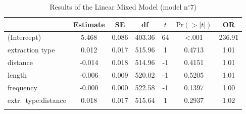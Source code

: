 \begin{table}
\begin{tabularx}{\textwidth}{Q S[table-format=-1.3] 
                  S[table-format=1.3] 
                  S[table-format=3.2] 
                  S[table-format=-1] 
                  S[table-format=<1.4] 
                  S[table-format=3.2]}
  \lsptoprule
 & {Estimate} & {SE} & {df} & {$t$} & {$\text{Pr}(>|t|)$} & {OR} \\ 
  \midrule
(Intercept) & 5.468 & 0.086 & 403.36 & 64 & <.001 & 236.91 \\ 
  extraction type & 0.012 & 0.017 & 515.96 & 1 & 0.4713 & 1.01 \\ 
  distance & -0.014 & 0.018 & 514.96 & -1 & 0.4151 & 1.01 \\ 
  length & -0.006 & 0.009 & 520.02 & -1 & 0.5205 & 1.01 \\ 
  frequency & -0.000 & 0.000 & 522.58 & -1 & 0.1397 & 1.00 \\ 
  extr.\ type:distance & 0.018 & 0.017 & 515.64 & 1 & 0.2937 & 1.02 \\ 
   \lspbottomrule
\end{tabularx}
\caption{Results of the Linear Mixed Model (model n$^{\circ}$7)}
\label{tab:exp03-m7}
\end{table}
